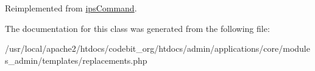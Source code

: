 Reimplemented from \hyperlink{classips_command_afbc4e912a0604b94d47d66744c64d8ba}{ips\-Command}.



The documentation for this class was generated from the following file\-:\begin{DoxyCompactItemize}
\item 
/usr/local/apache2/htdocs/codebit\-\_\-org/htdocs/admin/applications/core/modules\-\_\-admin/templates/replacements.\-php\end{DoxyCompactItemize}

